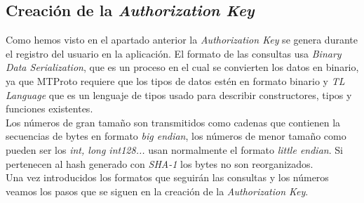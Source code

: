 \subsection{Creación de la \emph{Authorization Key}}
Como hemos visto en el apartado anterior la \emph{Authorization Key} se genera durante el registro del usuario en la aplicación. El formato de las consultas usa \emph{Binary Data Serialization}, que es un proceso en el cual se convierten los datos en binario, ya que MTProto requiere que los tipos de datos estén en formato binario y \emph{TL Language} que es un lenguaje de tipos usado para describir constructores, tipos y funciones existentes.\\
Los números de gran tamaño son transmitidos como cadenas que contienen la secuencias de bytes en formato \emph{big endian}, los números de menor tamaño como pueden ser los \emph{int, long int128...} usan normalmente el formato \emph{little endian}. Si pertenecen al hash generado con \emph{SHA-1} los bytes no son reorganizados.\\
Una vez introducidos los formatos que seguirán las consultas y los números veamos los pasos que se siguen en la creación de la \emph{Authorization Key}.

